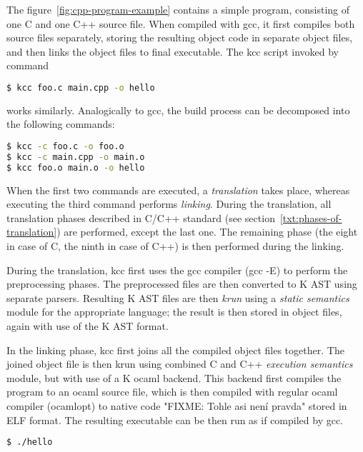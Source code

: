 \documentclass{fithesis3}
\begin{document}
The figure~\ref{fig:cpp-program-example} contains a simple program, consisting of one C and one C++ source file. When compiled with gcc, it first compiles both source files separately, storing the resulting object code in separate object files, and then links the object files to final executable. The kcc script invoked by command
\begin{lstlisting}[language=bash]
$ kcc foo.c main.cpp -o hello
\end{lstlisting}
works similarly. Analogically to gcc, the build process can be decomposed into the following commands:
\begin{lstlisting}[language=bash]
$ kcc -c foo.c -o foo.o
$ kcc -c main.cpp -o main.o
$ kcc foo.o main.o -o hello
\end{lstlisting}

When the first two commands are executed, a \textit{translation} takes place, whereas executing the third command performs \textit{linking}. During the translation, all translation phases described in C/C++ standard (see section~\ref{txt:phases-of-translation}) are performed, except the last one. The remaining phase (the eight in case of C, the ninth in case of C++) is then performed during the linking.

During the translation, kcc first uses the gcc compiler (gcc -E) to perform the preprocessing phases. The preprocessed files are then converted to K AST using separate parsers. Resulting K AST files are then \textit{krun} using a \textit{static semantics} module for the appropriate language; the result is then stored in object files, again with use of the K AST format.

In the linking phase, kcc first joins all the compiled object files together. The joined object file is then krun using combined C and C++ \textit{execution semantics} module, but with use of a K ocaml backend. This backend first compiles the program to an ocaml source file, which is then compiled with regular ocaml compiler (ocamlopt) to native code "FIXME: Tohle asi není pravda" stored in ELF format. The resulting executable can be then run as if compiled by gcc.

\begin{lstlisting}[language=bash]
$ ./hello
\end{lstlisting}


\end{document}
